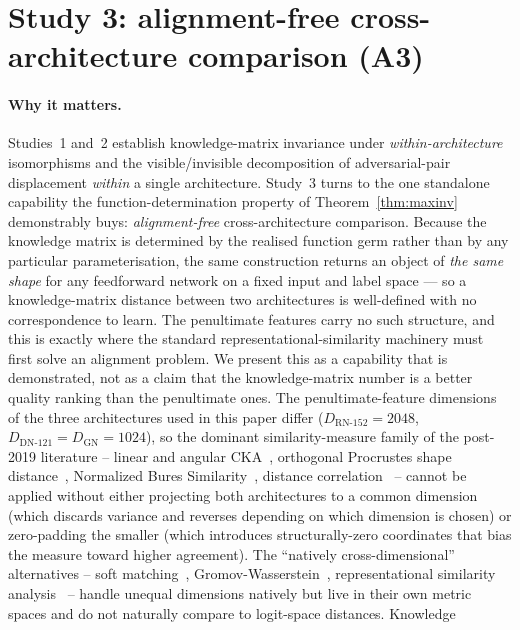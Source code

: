 \section{Study 3: alignment-free cross-architecture comparison (A3)}
\label{sec:study4}
\label{sec:A3}

\paragraph{Why it matters.}
Studies~1 and~2 establish knowledge-matrix invariance under
\emph{within-architecture} isomorphisms and the visible/invisible
decomposition of adversarial-pair displacement \emph{within} a single
architecture. Study~3 turns to the one standalone capability the
function-determination property of Theorem~\ref{thm:maxinv} demonstrably
buys: \emph{alignment-free} cross-architecture comparison. Because the
knowledge matrix is determined by the realised function germ rather than
by any particular parameterisation, the same construction returns an
object of \emph{the same shape} for any feedforward network on a fixed
input and label space --- so a knowledge-matrix distance between two
architectures is well-defined with no correspondence to learn. The
penultimate features carry no such structure, and this is exactly where
the standard representational-similarity machinery must first solve an
alignment problem. We present this as a capability that is demonstrated,
not as a claim that the knowledge-matrix number is a better
quality ranking than the penultimate ones. The penultimate-feature
dimensions of the
three architectures used in this paper differ
($D_{\text{RN-152}} = 2048$, $D_{\text{DN-121}} = D_{\text{GN}} = 1024$),
so the dominant similarity-measure family of the post-2019 literature --
linear and angular CKA~\citep{kornblith2019similarity}, orthogonal
Procrustes shape distance~\citep{williams2021generalized}, Normalized
Bures Similarity~\citep{harvey2023bures}, distance
correlation~\citep{szekely2007measuring} -- cannot be applied without
either projecting both architectures to a common dimension (which
discards variance and reverses depending on which dimension is chosen)
or zero-padding the smaller (which introduces structurally-zero
coordinates that bias the measure toward higher agreement). The
``natively cross-dimensional'' alternatives -- soft
matching~\citep{khosla2024soft}, Gromov-Wasserstein~\citep{memoli2011gromov},
representational similarity analysis~\citep{kriegeskorte2008representational}
-- handle unequal dimensions natively but live in their own metric
spaces and do not naturally compare to logit-space distances. Knowledge
